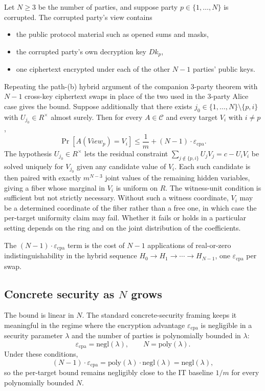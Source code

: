 \documentclass[11pt]{article}
\newcommand{\epscpa}{\varepsilon_{\mathrm{cpa}}}
\newcommand{\C}{\mathcal{C}}
\newcommand{\Dk}{\mathit{Dk}}
\begin{document}
Let $N \geq 3$ be the number of parties, and suppose party $p \in \{1, \ldots, N\}$ is corrupted. The corrupted party's view contains
\begin{itemize}
\item the public protocol material such as opened sums and masks,
\item the corrupted party's own decryption key $\Dk_p$,
\item one ciphertext encrypted under each of the other $N-1$ parties' public keys.
\end{itemize}
Repeating the path-(b) hybrid argument of the companion 3-party theorem with $N-1$ cross-key ciphertext swaps in place of the two used in the 3-party Alice case gives the bound. Suppose additionally that there exists $j_0 \in \{1, \ldots, N\} \setminus \{p, i\}$ with $U_{j_0} \in R^\times$ almost surely. Then for every $A \in \C$ and every target $V_i$ with $i \neq p$,
\[
\Pr[A(\mathit{View}_p) = V_i] \leq \frac{1}{m} + (N-1) \cdot \epscpa.
\]
The hypothesis $U_{j_0} \in R^\times$ lets the residual constraint $\sum_{j \notin \{p, i\}} U_j V_j = c - U_i V_i$ be solved uniquely for $V_{j_0}$ given any candidate value of $V_i$. Each such candidate is then paired with exactly $m^{N-3}$ joint values of the remaining hidden variables, giving a fiber whose marginal in $V_i$ is uniform on $R$. The witness-unit condition is sufficient but not strictly necessary. Without such a witness coordinate, $V_i$ may be a determined coordinate of the fiber rather than a free one, in which case the per-target uniformity claim may fail. Whether it fails or holds in a particular setting depends on the ring and on the joint distribution of the coefficients.

The $(N-1) \cdot \epscpa$ term is the cost of $N-1$ applications of real-or-zero indistinguishability in the hybrid sequence $H_0 \to H_1 \to \cdots \to H_{N-1}$, one $\epscpa$ per swap.

\subsection*{Concrete security as $N$ grows}

The bound is linear in $N$. The standard concrete-security framing keeps it meaningful in the regime where the encryption advantage $\epscpa$ is negligible in a security parameter $\lambda$ and the number of parties is polynomially bounded in $\lambda$:
\[
\epscpa = \mathrm{negl}(\lambda), \qquad N = \mathrm{poly}(\lambda).
\]
Under these conditions,
\[
(N-1) \cdot \epscpa = \mathrm{poly}(\lambda) \cdot \mathrm{negl}(\lambda) = \mathrm{negl}(\lambda),
\]
so the per-target bound remains negligibly close to the IT baseline $1/m$ for every polynomially bounded $N$.
\end{document}

